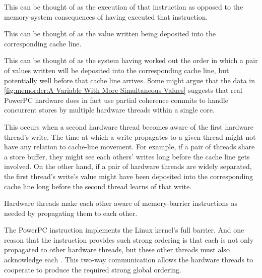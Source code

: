 \begin{description}[style=nextline]

\item[Instruction commit:]
This can be thought of as the execution of that instruction as opposed
to the memory-system consequences of having executed that instruction.

\item[Write reaching coherence point:]
This can be thought of as the value written being deposited into the
corresponding cache line.

\item[Partial coherence commit:]
This can be thought of as the system having worked out the order in which
a pair of values written will be deposited into the corresponding cache
line, but potentially well before that cache line arrives.
Some might argue that the data in
\cref{fig:memorder:A Variable With More Simultaneous Values}
suggests that real PowerPC hardware does in fact use partial coherence
commits to handle concurrent stores by multiple hardware threads within
a single core.

\item[Write propagate to thread:]
This occurs when a second hardware thread becomes aware of the first
hardware thread's write.
The time at which a write propagates to a given thread might not have
any relation to cache-line movement.
For example, if a pair of threads share a store buffer, they might see
each others' writes long before the cache line gets involved.
On the other hand, if a pair of hardware threads are widely separated,
the first thread's write's value might have been deposited into the
corresponding cache line long before the second thread learns of that
write.

\item[Barrier propagate to thread:]
Hardware threads make each other aware of memory-barrier instructions
as needed by propagating them to each other.

\item[Acknowledge \tco{sync}:]
The PowerPC  instruction implements the Linux kernel's
 full barrier.
And one reason that the  instruction provides such strong
ordering is that each  is not only propagated to other hardware
threads, but these other threads must also acknowledge each .
This two-way communication allows the hardware threads to cooperate
to produce the required strong global ordering.

\end{description}

